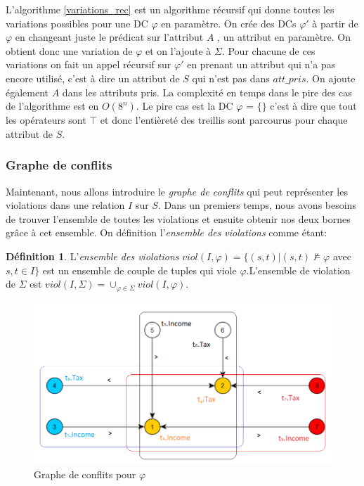 \documentclass[letterpaper, 12pt]{report}
\theoremstyle{definition}
\newtheorem{mydef}{Définition}
\begin{document}
L'algorithme \ref{variations_rec} est un algorithme récursif qui donne toutes les variations possibles pour une DC $\varphi$ en paramètre. On crée des DCs $\varphi'$ à partir de $\varphi$ en changeant juste le prédicat sur l'attribut $A$ , un attribut en paramètre. On obtient donc une variation de $\varphi$ et on l'ajoute à $\Sigma$. Pour chacune de ces variations on fait un appel récursif sur $\varphi'$ en prenant un attribut qui n'a pas encore utilisé, c'est à dire un attribut de $S$ qui n'est pas dans $att\_pris$. On ajoute également $A$ dans les attributs pris. La complexité en temps dans le pire des cas de l'algorithme est en $O(8^{n})$. Le pire cas est la DC $\varphi$ = $\{\}$ c'est à dire que tout les opérateurs sont $\top$ et donc l'entièreté des treillis sont parcourus pour chaque attribut de $S$.

\subsubsection{Graphe de conflits}

Maintenant, nous allons introduire le \emph{graphe de conflits} qui peut représenter les violations dans une relation $I$ sur $S$. Dans un premiers temps, nous avons besoins de trouver l'ensemble de toutes les violations et ensuite obtenir nos deux bornes grâce à cet ensemble. On définition l'\emph{ensemble des violations} comme étant: \cite{main}

\begin{mydef}
 L'\emph{ensemble des violations} $viol(I,\varphi) = \{ (s,t) | (s,t) \not\models \varphi $ avec $ s,t \in I \}$ est un ensemble de couple de tuples qui viole $\varphi$.L'ensemble de violation de $\Sigma$ est $viol(I,\Sigma) = \cup_{\varphi \in \Sigma}viol(I,\varphi)$.
\end{mydef}

\begin{figure}
 \centering
 \includegraphics[scale=0.8]{img/grapht4.png}
 \caption{\label{grapht4} Graphe de conflits pour $\varphi$}
\end{figure}
\end{document}
